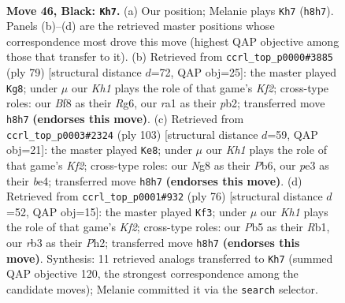 \documentclass[11pt]{article}
\begin{document}
\clearpage

\begin{figure}[p]\centering
\begin{subfigure}{0.46\textwidth}\centering
\resizebox{\linewidth}{!}{%
\newchessgame
\chessboard[
  setfen={2r2bnk/p5p1/P1b5/1p3p1p/1P3P2/1R2P1P1/8/RNB3K1 b - - 7 46},
  showmover=false,
  pgfstyle=straightmove, color=movearrow, markmove={h8-h7}
]}
\caption{}
\end{subfigure}\hfill
\begin{subfigure}{0.46\textwidth}\centering
\resizebox{\linewidth}{!}{%
\newchessgame
\chessboard[
  setfen={8/1pp2kp1/2pb2r1/8/p7/2PK1N1P/PP3RP1/8 b - - 7 40},
  showmover=false,
  pgfstyle=straightmove, color=movearrow, markmove={f7-g8}
]}
\caption{}
\end{subfigure}
\\[4pt]
\begin{subfigure}{0.46\textwidth}\centering
\resizebox{\linewidth}{!}{%
\newchessgame
\chessboard[
  setfen={3r1b2/5k2/1p2p2p/p3p1p1/4B1P1/P1P1R2P/1P3P2/4K3 b - - 26 52},
  showmover=false,
  pgfstyle=straightmove, color=movearrow, markmove={f7-e8}
]}
\caption{}
\end{subfigure}\hfill
\begin{subfigure}{0.46\textwidth}\centering
\resizebox{\linewidth}{!}{%
\newchessgame
\chessboard[
  setfen={1br5/pp3rk1/6p1/5p1p/PB1P1P2/3BP3/5KPP/1R6 w - - 0 39},
  showmover=false,
  pgfstyle=straightmove, color=movearrow, markmove={f2-f3}
]}
\caption{}
\end{subfigure}
\caption{\textbf{Move 46, Black: \texttt{Kh7}.} (a) Our position; Melanie plays \texttt{Kh7} (\texttt{h8h7}). Panels (b)--(d) are the retrieved master positions whose correspondence most drove this move (highest QAP objective among those that transfer to it). (b) Retrieved from \texttt{ccrl\_top\_p0000\#3885} (ply 79) [structural distance $d$=72, QAP obj=25]: the master played \texttt{Kg8}; under $\mu$ our \emph{Kh1} plays the role of that game's \emph{Kf2}; cross-type roles: our \emph{B}f8 as their \emph{R}g6, our \emph{r}a1 as their \emph{p}b2; transferred move \texttt{h8h7} \textbf{(endorses this move)}. (c) Retrieved from \texttt{ccrl\_top\_p0003\#2324} (ply 103) [structural distance $d$=59, QAP obj=21]: the master played \texttt{Ke8}; under $\mu$ our \emph{Kh1} plays the role of that game's \emph{Kf2}; cross-type roles: our \emph{N}g8 as their \emph{P}b6, our \emph{p}e3 as their \emph{b}e4; transferred move \texttt{h8h7} \textbf{(endorses this move)}. (d) Retrieved from \texttt{ccrl\_top\_p0001\#932} (ply 76) [structural distance $d$=52, QAP obj=15]: the master played \texttt{Kf3}; under $\mu$ our \emph{Kh1} plays the role of that game's \emph{Kf2}; cross-type roles: our \emph{P}b5 as their \emph{R}b1, our \emph{r}b3 as their \emph{P}h2; transferred move \texttt{h8h7} \textbf{(endorses this move)}. Synthesis: 11 retrieved analogs transferred to \texttt{Kh7} (summed QAP objective 120, the strongest correspondence among the candidate moves); Melanie committed it via the \texttt{search} selector.}
\label{fig:thought-m91}
\end{figure}
\end{document}
